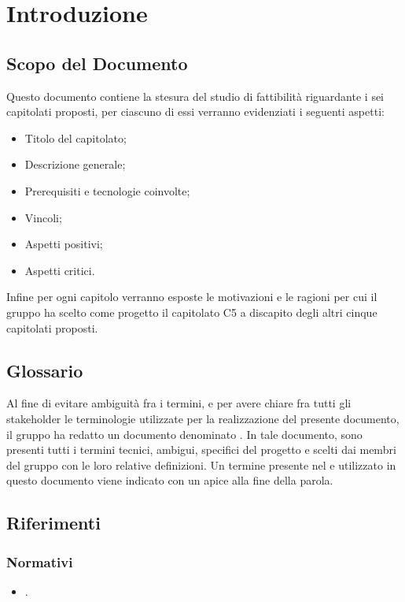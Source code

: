 \section{Introduzione}
\subsection{Scopo del Documento}
Questo documento contiene la stesura del studio di fattibilità riguardante i sei capitolati proposti, per ciascuno di essi verranno evidenziati i seguenti aspetti:
\begin{itemize}
\item Titolo del capitolato;
\item Descrizione generale;
\item Prerequisiti e tecnologie coinvolte;
\item Vincoli;
\item Aspetti positivi;
\item Aspetti critici.
\end{itemize}
Infine per ogni capitolo verranno esposte le motivazioni e le ragioni per cui il gruppo ha scelto come progetto il capitolato C5 \NomeProgetto{} a discapito degli altri cinque capitolati proposti.

\subsection{Glossario}
Al fine di evitare ambiguità fra i termini, e per avere chiare fra tutti gli stakeholder le terminologie utilizzate per la realizzazione del presente documento, il gruppo \Gruppo{} ha redatto un documento denominato .
In tale documento, sono presenti tutti i termini tecnici, ambigui, specifici del progetto e scelti dai membri del gruppo con le loro relative definizioni.
Un termine presente nel  e utilizzato in questo documento viene indicato con un apice  alla fine della parola.

\subsection{Riferimenti}

\subsubsection{Normativi}
\begin{itemize}
\item {}.
\end{itemize}

